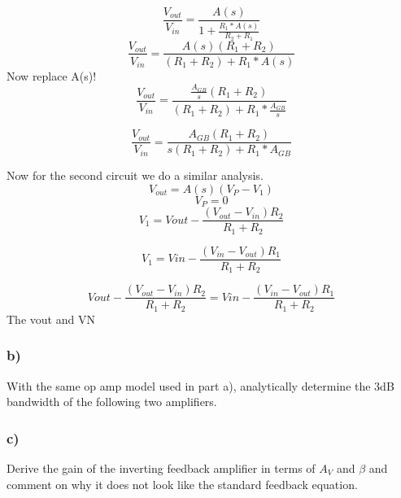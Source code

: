 \documentclass[10pt,a4paper]{article}
\begin{document}
\begin{equation}
\frac{V_{out}}{V_{in}} = \frac{A(s)}{1+\frac{R_1 * A(s)}{R_2 + R_1}} 
\end{equation}
\begin{equation}
\frac{V_{out}}{V_{in}} = \frac{A(s)(R_1 + R_2)}{(R_1 + R_2) + R_1 * A(s)} 
\end{equation}
Now replace A(s)!
\begin{equation}
\frac{V_{out}}{V_{in}} = \frac{\frac{A_{GB}}{s}(R_1 + R_2)}{(R_1 + R_2) + R_1 * \frac{A_{GB}}{s}} 
\end{equation}

\begin{equation}
\frac{V_{out}}{V_{in}} = \frac{A_{GB}(R_1 + R_2)}{s(R_1 + R_2) + R_1 * A_{GB}} 
\end{equation}


Now for the second circuit we do a similar analysis.
\begin{equation}
V_{out} = A(s)(V_P - V_1)
\end{equation}
\begin{equation}
V_P = 0
\end{equation}
\begin{equation}
V_1 = Vout - \frac{(V_{out} - V_{in})R_2}{R_1+R_2}
\end{equation}

\begin{equation}
V_1 = Vin - \frac{(V_{in} - V_{out})R_1}{R_1+R_2}
\end{equation}

\begin{equation}
Vout - \frac{(V_{out} - V_{in})R_2}{R_1+R_2} = Vin - \frac{(V_{in} - V_{out})R_1}{R_1+R_2}
\end{equation}
The vout and VN



\subsubsection*{b)}
With the same op amp model used in part a), analytically determine the 3dB
bandwidth of the following two amplifiers.



\subsubsection*{c)}
Derive the gain of the inverting feedback amplifier in terms of \(A_{V}\) and \(\beta\) and
comment on why it does not look like the standard feedback equation.
\end{document}
